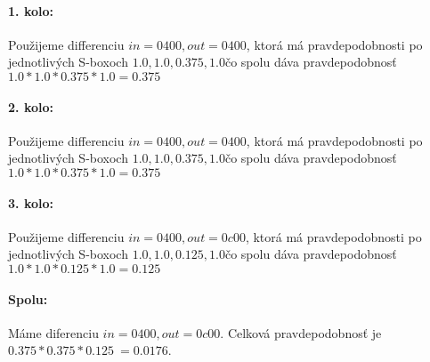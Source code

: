 \paragraph{1. kolo:}
Použijeme differenciu $in= 0400 , out= 0400 $,
ktorá má pravdepodobnosti po jednotlivých S-boxoch $
1.0,1.0,0.375,1.0
$čo spolu dáva pravdepodobnosť 
$ 1.0*1.0*0.375*1.0 = 0.375 $

\paragraph{2. kolo:}
Použijeme differenciu $in= 0400 , out= 0400 $,
ktorá má pravdepodobnosti po jednotlivých S-boxoch $
1.0,1.0,0.375,1.0
$čo spolu dáva pravdepodobnosť 
$ 1.0*1.0*0.375*1.0 = 0.375 $

\paragraph{3. kolo:}
Použijeme differenciu $in= 0400 , out= 0c00 $,
ktorá má pravdepodobnosti po jednotlivých S-boxoch $
1.0,1.0,0.125,1.0
$čo spolu dáva pravdepodobnosť 
$ 1.0*1.0*0.125*1.0 = 0.125 $

\paragraph{Spolu:}  Máme diferenciu $in= 0400 , out= 0c00 $.
Celková pravdepodobnosť je $ 0.375*0.375*0.125 ~= 0.0176 $.
